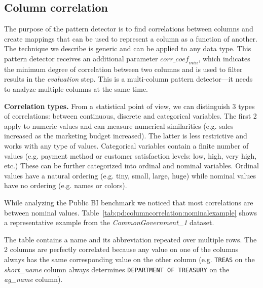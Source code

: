 \subsection{Column correlation}
\label{subsec:pd:columncorrelation}



\graphicspath{{5_automatic_learning/pattern_detection/images/}}

% 

The purpose of the  pattern detector is to find correlations between columns and create mappings that can be used to represent a column as a function of another. The technique we describe is generic and can be applied to any data type. This pattern detector receives an additional parameter \(\mathit{corr\_coef}_{min}\), which indicates the minimum degree of correlation between two columns and is used to filter results in the \textit{evaluation} step. This is a multi-column pattern detector---it needs to analyze multiple columns at the same time.

\textbf{Correlation types.} From a statistical point of view, we can distinguish 3 types of correlations: between continuous, discrete and categorical variables. The first 2 apply to numeric values and can measure numerical similarities (e.g. sales increased as the marketing budget increased). The latter is less restrictive and works with any type of values. Categorical variables contain a finite number of values (e.g. payment method or customer satisfaction levels: low, high, very high, etc.) 
These can be further categorized into ordinal and nominal variables. Ordinal values have a natural ordering (e.g. tiny, small, large, huge) while nominal values have no ordering (e.g. names or colors).

While analyzing the Public BI benchmark we noticed that most correlations are between nominal values. Table~\ref{tab:pd:columncorrelation:nominalexample} shows a representative example from the \textit{CommonGovernment\_1} dataset.



The table contains a name and its abbreviation repeated over multiple rows. The 2 columns are perfectly correlated because any value on one of the columns always has the same corresponding value on the other column (e.g. \verb|TREAS| on the \textit{short\_name} column always determines \verb|DEPARTMENT OF TREASURY| on the \textit{ag\_name} column).

